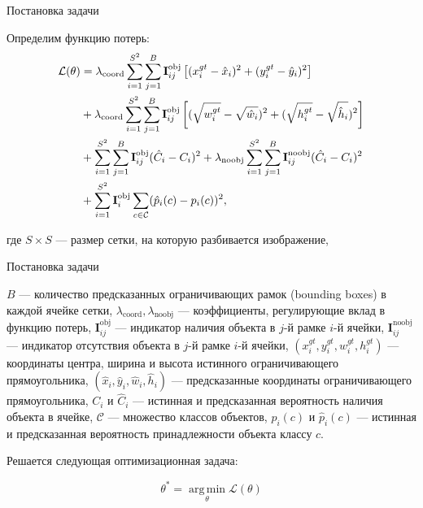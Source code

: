 \documentclass{beamer}
\begin{document}
\begin{frame}{Постановка задачи}


Определим функцию потерь:
\begin{align*}
\mathcal{L}(\theta) &= \lambda_{\text{coord}} \sum_{i=1}^{S^2} \sum_{j=1}^{B} \textbf{I}_{ij}^{\text{obj}} 
\left[ (x^{gt}_i - \hat{x}_i)^2 + (y^{gt}_i - \hat{y}_i)^2 \right] \notag \\
&+ \lambda_{\text{coord}} \sum_{i=1}^{S^2} \sum_{j=1}^{B} \textbf{I}_{ij}^{\text{obj}} 
\left[ (\sqrt{w^{gt}_i} - \sqrt{\hat{w}_i})^2 + (\sqrt{h^{gt}_i} - \sqrt{\hat{h}_i})^2 \right] \notag \\
&+ \sum_{i=1}^{S^2} \sum_{j=1}^{B} \textbf{I}_{ij}^{\text{obj}} (\hat{C}_i - C_i)^2 
+ \lambda_{\text{noobj}} \sum_{i=1}^{S^2} \sum_{j=1}^{B} \textbf{I}_{ij}^{\text{noobj}} (\hat{C}_i - C_i)^2 \notag \\
&+ \sum_{i=1}^{S^2} \textbf{I}_{i}^{\text{obj}} \sum_{c \in \mathcal{C}} (\hat{p}_i(c) - p_i(c))^2,
\end{align*}

где 
$S \times S$ — размер сетки, на которую разбивается изображение,  

\end{frame}

\begin{frame}{Постановка задачи}

$B$ — количество предсказанных ограничивающих рамок (bounding boxes) в каждой ячейке сетки,  
$\lambda_{\text{coord}}, \lambda_{\text{noobj}}$ — коэффициенты, регулирующие вклад  в функцию потерь,
$\textbf{I}_{ij}^{\text{obj}}$ — индикатор наличия объекта в $j$-й рамке $i$-й ячейки,  
$\textbf{I}_{ij}^{\text{noobj}}$ — индикатор отсутствия объекта в $j$-й рамке $i$-й ячейки,  
$(x^{gt}_i, y^{gt}_i, w^{gt}_i, h^{gt}_i)$ — координаты центра, ширина и высота истинного ограничивающего прямоугольника,  
$(\hat{x}_i, \hat{y}_i, \hat{w}_i, \hat{h}_i)$ — предсказанные координаты ограничивающего прямоугольника,  
$C_i$ и $\hat{C}_i$ — истинная и предсказанная вероятность наличия объекта в ячейке,  \(\mathcal{C}\) — множество классов объектов,
$p_i(c)$ и $\hat{p}_i(c)$ — истинная и предсказанная вероятность принадлежности объекта классу $c$.




\begin{center}
Решается следующая оптимизационная задача:
\end{center}\vspace{-1em} 

\[
\theta^* = \operatorname*{arg\,min}_{\theta} \mathcal{L}(\theta)
\]

\end{frame}
\end{document}
